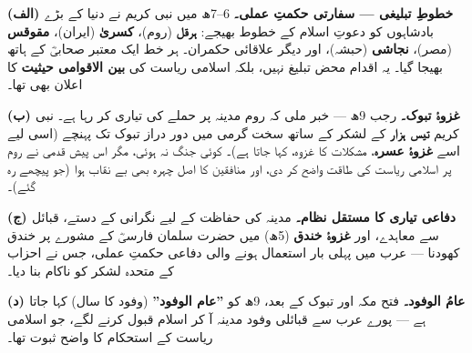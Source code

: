 \begin{hal}
\textbf{(الف) خطوطِ تبلیغی --- سفارتی حکمتِ عملی۔} \textenglish{6--7}ھ میں
نبی کریم \saw نے دنیا کے بڑے بادشاہوں کو دعوتِ اسلام کے خطوط بھیجے:
\textbf{ہرقل} (روم)، \textbf{کسریٰ} (ایران)، \textbf{مقوقس} (مصر)،
\textbf{نجاشی} (حبشہ)، اور دیگر علاقائی حکمران۔ ہر خط ایک معتبر صحابیؓ کے
ہاتھ بھیجا گیا۔ یہ اقدام محض تبلیغ نہیں، بلکہ اسلامی ریاست کی
\textbf{بین الاقوامی حیثیت} کا اعلان بھی تھا۔

\medskip
\textbf{(ب) غزوۂ تبوک۔} رجب \textenglish{9}ھ --- خبر ملی کہ روم مدینہ پر
حملے کی تیاری کر رہا ہے۔ نبی کریم \saw \textbf{تیس ہزار} کے لشکر کے ساتھ
سخت گرمی میں دور دراز تبوک تک پہنچے (اسی لیے اسے \textbf{غزوۂ عسرہ}،
مشکلات کا غزوہ، کہا جاتا ہے)۔ کوئی جنگ نہ ہوئی، مگر اس پیش قدمی نے روم پر
اسلامی ریاست کی طاقت واضح کر دی، اور منافقین کا اصل چہرہ بھی بے نقاب ہوا
(جو پیچھے رہ گئے)۔

\medskip
\textbf{(ج) دفاعی تیاری کا مستقل نظام۔} مدینہ کی حفاظت کے لیے نگرانی کے
دستے، قبائل سے معاہدے، اور \textbf{غزوۂ خندق} (\textenglish{5}ھ) میں
حضرت سلمان فارسیؓ کے مشورے پر خندق کھودنا --- عرب میں پہلی بار استعمال
ہونے والی دفاعی حکمتِ عملی، جس نے احزاب کے متحدہ لشکر کو ناکام بنا دیا۔

\medskip
\textbf{(د) عامُ الوفود۔} فتح مکہ اور تبوک کے بعد، \textenglish{9}ھ کو
\textbf{''عام الوفود''} (وفود کا سال) کہا جاتا ہے --- پورے عرب سے قبائلی
وفود مدینہ آ کر اسلام قبول کرنے لگے، جو اسلامی ریاست کے استحکام کا واضح
ثبوت تھا۔
\end{hal}
